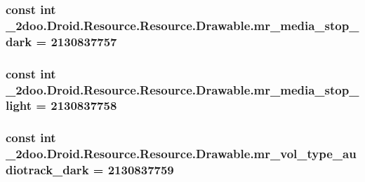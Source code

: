 \hypertarget{class__2doo_1_1_droid_1_1_resource_1_1_drawable_1f88e9abc39c78574e879e8b57ee936d}{
\subsubsection[{mr\_\-media\_\-stop\_\-dark}]{\setlength{\rightskip}{0pt plus 5cm}const int \_\-2doo.Droid.Resource.Resource.Drawable.mr\_\-media\_\-stop\_\-dark = 2130837757}}
\label{class__2doo_1_1_droid_1_1_resource_1_1_drawable_1f88e9abc39c78574e879e8b57ee936d}


\hypertarget{class__2doo_1_1_droid_1_1_resource_1_1_drawable_2bc89455191f568eda955003a42aae36}{
\subsubsection[{mr\_\-media\_\-stop\_\-light}]{\setlength{\rightskip}{0pt plus 5cm}const int \_\-2doo.Droid.Resource.Resource.Drawable.mr\_\-media\_\-stop\_\-light = 2130837758}}
\label{class__2doo_1_1_droid_1_1_resource_1_1_drawable_2bc89455191f568eda955003a42aae36}


\hypertarget{class__2doo_1_1_droid_1_1_resource_1_1_drawable_2b09e398bf31e4fab316307966aa0d0d}{
\subsubsection[{mr\_\-vol\_\-type\_\-audiotrack\_\-dark}]{\setlength{\rightskip}{0pt plus 5cm}const int \_\-2doo.Droid.Resource.Resource.Drawable.mr\_\-vol\_\-type\_\-audiotrack\_\-dark = 2130837759}}
\label{class__2doo_1_1_droid_1_1_resource_1_1_drawable_2b09e398bf31e4fab316307966aa0d0d}


